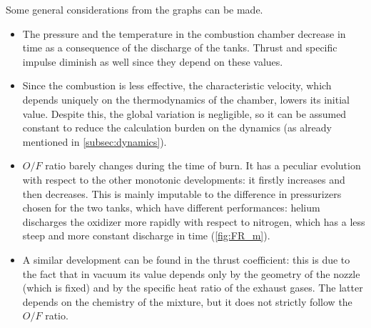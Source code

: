 
Some general considerations from the graphs can be made.
\begin{itemize}
    \item The pressure and the temperature in the combustion chamber decrease in time as a consequence of the discharge of the tanks. Thrust and specific impulse diminish as well since they depend on these values.
    \item Since the combustion is less effective, the characteristic velocity, which depends uniquely on the thermodynamics of the chamber, lowers its initial value. Despite this, the global variation is negligible, so it can be assumed constant to reduce the calculation burden on the dynamics (as already mentioned in \autoref{subsec:dynamics}).
    \item $O/F$ ratio barely changes during the time of burn. It has a peculiar evolution with respect to the other monotonic developments: it firstly increases and then decreases. This is mainly imputable to the difference in pressurizers chosen for the two tanks, which have different performances: helium discharges the oxidizer more rapidly with respect to nitrogen, which has a less steep and more constant discharge in time (\autoref{fig:FR_m}).
    \item A similar development can be found in the thrust coefficient: this is due to the fact that in vacuum its value depends only by the geometry of the nozzle (which is fixed) and by the specific heat ratio of the exhaust gases. The latter depends on the chemistry of the mixture, but it does not strictly follow the $O/F$ ratio.
\end{itemize}
